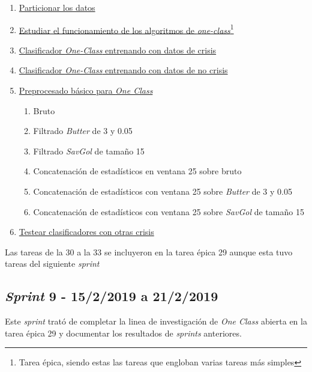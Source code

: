 \begin{enumerate}\addtocounter{enumi}{27}
	\item \href{https://github.com/joselucross/TFG-SmartBeds/issues/28}{Particionar los datos}
	\item \href{https://github.com/joselucross/TFG-SmartBeds/issues/29}{Estudiar el funcionamiento de los algoritmos de \textit{one-class}\footnote{Tarea épica, siendo estas las tareas que engloban varias tareas más simples}}
	\item \href{https://github.com/joselucross/TFG-SmartBeds/issues/30}{Clasificador \textit{One-Class} entrenando con datos de crisis}
	\item \href{https://github.com/joselucross/TFG-SmartBeds/issues/31}{Clasificador \textit{One-Class} entrenando con datos de no crisis}
	\item \href{https://github.com/joselucross/TFG-SmartBeds/issues/32}{Preprocesado básico para \textit{One Class}}
	\begin{enumerate}
		\item Bruto
		\item Filtrado \textit{Butter} de 3 y 0.05
		\item Filtrado \textit{SavGol} de tamaño 15
		\item Concatenación de estadísticos en ventana 25 sobre bruto
		\item Concatenación de estadísticos con ventana 25 sobre \textit{Butter} de 3 y 0.05
		\item Concatenación de estadísticos con ventana 25 sobre \textit{SavGol} de tamaño 15
	\end{enumerate}
	\item \href{https://github.com/joselucross/TFG-SmartBeds/issues/33}{Testear clasificadores con otras crisis}
\end{enumerate}
Las tareas de la 30 a la 33 se incluyeron en la tarea épica 29 aunque esta tuvo tareas del siguiente \textit{sprint}

\subsection{\textit{Sprint} 9 - 15/2/2019 a 21/2/2019}
Este \textit{sprint} trató de completar la linea de investigación de \textit{One Class} abierta en la tarea épica 29 y documentar los resultados de \textit{sprints} anteriores. 

